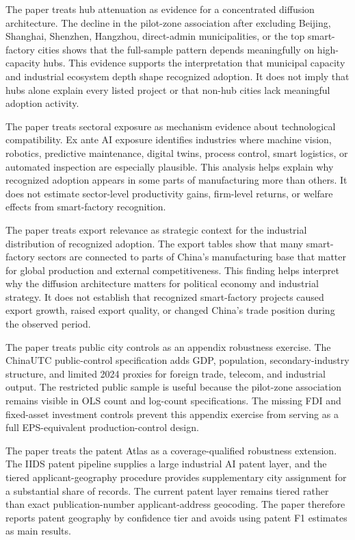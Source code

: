 \documentclass[12pt]{article}
\begin{document}
The paper treats hub attenuation as evidence for a concentrated diffusion architecture. The decline in the pilot-zone association after excluding Beijing, Shanghai, Shenzhen, Hangzhou, direct-admin municipalities, or the top smart-factory cities shows that the full-sample pattern depends meaningfully on high-capacity hubs. This evidence supports the interpretation that municipal capacity and industrial ecosystem depth shape recognized adoption. It does not imply that hubs alone explain every listed project or that non-hub cities lack meaningful adoption activity.

The paper treats sectoral exposure as mechanism evidence about technological compatibility. Ex ante AI exposure identifies industries where machine vision, robotics, predictive maintenance, digital twins, process control, smart logistics, or automated inspection are especially plausible. This analysis helps explain why recognized adoption appears in some parts of manufacturing more than others. It does not estimate sector-level productivity gains, firm-level returns, or welfare effects from smart-factory recognition.

The paper treats export relevance as strategic context for the industrial distribution of recognized adoption. The export tables show that many smart-factory sectors are connected to parts of China's manufacturing base that matter for global production and external competitiveness. This finding helps interpret why the diffusion architecture matters for political economy and industrial strategy. It does not establish that recognized smart-factory projects caused export growth, raised export quality, or changed China's trade position during the observed period.

The paper treats public city controls as an appendix robustness exercise. The ChinaUTC public-control specification adds GDP, population, secondary-industry structure, and limited 2024 proxies for foreign trade, telecom, and industrial output. The restricted public sample is useful because the pilot-zone association remains visible in OLS count and log-count specifications. The missing FDI and fixed-asset investment controls prevent this appendix exercise from serving as a full EPS-equivalent production-control design.

The paper treats the patent Atlas as a coverage-qualified robustness extension. The IIDS patent pipeline supplies a large industrial AI patent layer, and the tiered applicant-geography procedure provides supplementary city assignment for a substantial share of records. The current patent layer remains tiered rather than exact publication-number applicant-address geocoding. The paper therefore reports patent geography by confidence tier and avoids using patent F1 estimates as main results.
\end{document}
